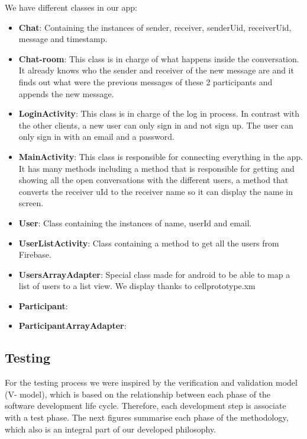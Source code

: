 We have different classes in our app:

\begin{itemize}
	\item \textbf{Chat}: Containing the instances of sender, receiver, senderUid, receiverUid, message and timestamp.
	
	\item \textbf{Chat-room}: This class is in charge of what happens inside the conversation. It already knows who the sender and receiver of the new message are and it finds out what were the previous messages of these 2 participants and appends the new message. 
	
	\item \textbf{LoginActivity}: This class is in charge of the log in process. In contrast with the other clients, a new user can only sign in and not sign up. The user can only sign in with an email and a password.
	
	\item \textbf{MainActivity}: This class is responsible for connecting everything in the app. It has many methods including a method that is responsible for getting and showing all the open conversations with the different users, a method that converts the receiver uId to the receiver name so it can display the name in screen.
	
	\item \textbf{User}: Class containing the instances of name, userId and email.
	
	\item \textbf{UserListActivity}: Class containing a method to get all the users from Firebase.

	\item \textbf{UsersArrayAdapter}: Special class made for android to be able to map a list of users to a list view. We display thanks to cellprototype.xm
	
	\item \textbf{Participant}: 
	
	\item \textbf{ParticipantArrayAdapter}: 
	
\end{itemize}




\subsection{Testing}

For the testing process we were inspired by the verification and validation model (V- model), which is based on the relationship between each phase of the software development life cycle. Therefore, each development step is associate with a test phase.   The next figures summarise each phase of the methodology, which also is an integral part of our developed philosophy. 

